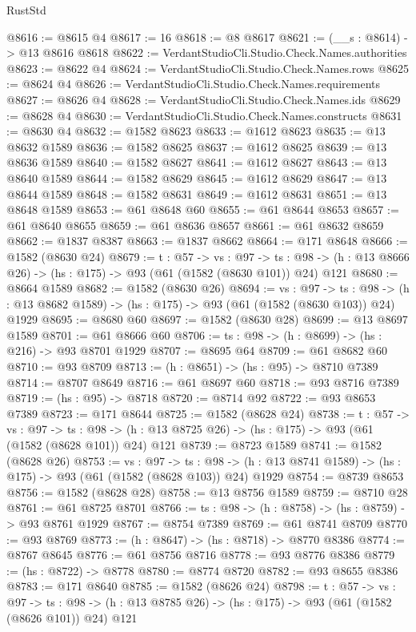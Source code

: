 \begin{lexlean}{RustStd}
\begin{coremodule}
@8616 := @8615 @4
@8617 := 16
@8618 := @8 @8617
@8621 := (__s : @8614) -> @13 @8616 @8618
@8622 := VerdantStudioCli.Studio.Check.Names.authorities
@8623 := @8622 @4
@8624 := VerdantStudioCli.Studio.Check.Names.rows
@8625 := @8624 @4
@8626 := VerdantStudioCli.Studio.Check.Names.requirements
@8627 := @8626 @4
@8628 := VerdantStudioCli.Studio.Check.Names.ids
@8629 := @8628 @4
@8630 := VerdantStudioCli.Studio.Check.Names.constructs
@8631 := @8630 @4
@8632 := @1582 @8623
@8633 := @1612 @8623
@8635 := @13 @8632 @1589
@8636 := @1582 @8625
@8637 := @1612 @8625
@8639 := @13 @8636 @1589
@8640 := @1582 @8627
@8641 := @1612 @8627
@8643 := @13 @8640 @1589
@8644 := @1582 @8629
@8645 := @1612 @8629
@8647 := @13 @8644 @1589
@8648 := @1582 @8631
@8649 := @1612 @8631
@8651 := @13 @8648 @1589
@8653 := @61 @8648 @60
@8655 := @61 @8644 @8653
@8657 := @61 @8640 @8655
@8659 := @61 @8636 @8657
@8661 := @61 @8632 @8659
@8662 := @1837 @8387
@8663 := @1837 @8662
@8664 := @171 @8648
@8666 := @1582 (@8630 @24)
@8679 := {t : @57} ->
  {vs : @97} ->
  {ts : @98} -> (h : @13 @8666 @26) -> (hs : @175) -> @93 (@61 (@1582 (@8630 @101)) @24) @121
@8680 := @8664 @1589
@8682 := @1582 (@8630 @26)
@8694 := {vs : @97} ->
  {ts : @98} -> (h : @13 @8682 @1589) -> (hs : @175) -> @93 (@61 (@1582 (@8630 @103)) @24) @1929
@8695 := @8680 @60
@8697 := @1582 (@8630 @28)
@8699 := @13 @8697 @1589
@8701 := @61 @8666 @60
@8706 := {ts : @98} -> (h : @8699) -> (hs : @216) -> @93 @8701 @1929
@8707 := @8695 @64
@8709 := @61 @8682 @60
@8710 := @93 @8709
@8713 := (h : @8651) -> (hs : @95) -> @8710 @7389
@8714 := @8707 @8649
@8716 := @61 @8697 @60
@8718 := @93 @8716 @7389
@8719 := (hs : @95) -> @8718
@8720 := @8714 @92
@8722 := @93 @8653 @7389
@8723 := @171 @8644
@8725 := @1582 (@8628 @24)
@8738 := {t : @57} ->
  {vs : @97} ->
  {ts : @98} -> (h : @13 @8725 @26) -> (hs : @175) -> @93 (@61 (@1582 (@8628 @101)) @24) @121
@8739 := @8723 @1589
@8741 := @1582 (@8628 @26)
@8753 := {vs : @97} ->
  {ts : @98} -> (h : @13 @8741 @1589) -> (hs : @175) -> @93 (@61 (@1582 (@8628 @103)) @24) @1929
@8754 := @8739 @8653
@8756 := @1582 (@8628 @28)
@8758 := @13 @8756 @1589
@8759 := @8710 @28
@8761 := @61 @8725 @8701
@8766 := {ts : @98} -> (h : @8758) -> (hs : @8759) -> @93 @8761 @1929
@8767 := @8754 @7389
@8769 := @61 @8741 @8709
@8770 := @93 @8769
@8773 := (h : @8647) -> (hs : @8718) -> @8770 @8386
@8774 := @8767 @8645
@8776 := @61 @8756 @8716
@8778 := @93 @8776 @8386
@8779 := (hs : @8722) -> @8778
@8780 := @8774 @8720
@8782 := @93 @8655 @8386
@8783 := @171 @8640
@8785 := @1582 (@8626 @24)
@8798 := {t : @57} ->
  {vs : @97} ->
  {ts : @98} -> (h : @13 @8785 @26) -> (hs : @175) -> @93 (@61 (@1582 (@8626 @101)) @24) @121

\end{coremodule}
\end{lexlean}
